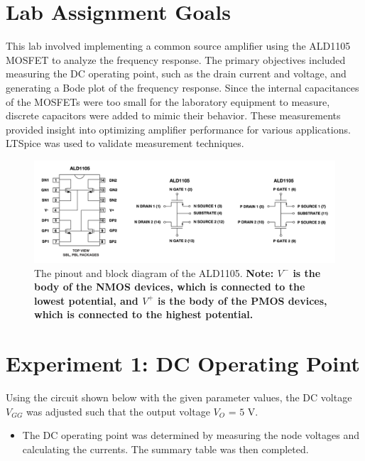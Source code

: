 
\onehalfspacing
\section{Lab Assignment Goals}
\vspace{0.25cm}
\justifying 
This lab involved implementing a common source amplifier using the ALD1105 MOSFET to analyze the frequency response. The primary objectives included measuring the DC operating point, such as the drain current and voltage, and generating a Bode plot of the frequency response. Since the internal capacitances of the MOSFETs were too small for the laboratory equipment to measure, discrete capacitors were added to mimic their behavior. These measurements provided insight into optimizing amplifier performance for various applications. LTSpice was used to validate measurement techniques. 

\begin{center}
\begin{figure}[ht]
\includegraphics[scale=0.5]{Chapter_4/Lab_04_Image_1.png}
\caption{The pinout and block diagram of the ALD1105. \textbf{Note: $V^{-}$ is the body of the NMOS devices, which is connected to the lowest potential, and $V^{+}$ is the body of the PMOS devices, which is connected to the highest potential.}}
\label{Ch4_fig:1}
\end{figure}
\end{center}

\section{Experiment 1: DC Operating Point}

Using the circuit shown below with the given parameter values, the DC voltage $V_{GG}$ was adjusted such that the output voltage $V_{O}$ = $5$ V.

\begin{itemize}
    \item The DC operating point was determined by measuring the node voltages and calculating the currents. The summary table was then completed.
\end{itemize}

